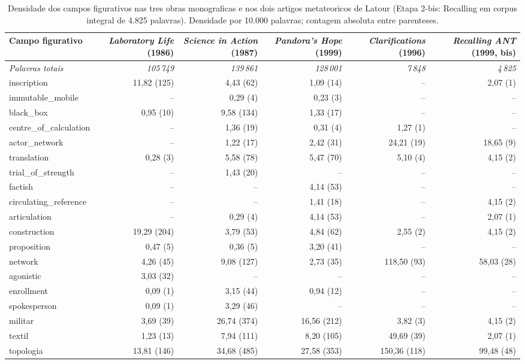 \begin{table}[htbp]
\centering
\caption{Densidade dos campos figurativos nas tres obras monograficas e nos dois artigos metateoricos de Latour (Etapa 2-bis: Recalling em corpus integral de 4.825 palavras). Densidade por 10.000 palavras; contagem absoluta entre parenteses.}
\label{tab:figuracoes_latour_5_obras_bis}
\small
\begin{tabular}{lrrrrr}
\toprule
Campo figurativo & \emph{Laboratory Life} (1986) & \emph{Science in Action} (1987) & \emph{Pandora's Hope} (1999) & \emph{Clarifications} (1996) & \emph{Recalling ANT} (1999, bis) \\
\midrule
\textit{Palavras totais} & \textit{105\,749} & \textit{139\,861} & \textit{128\,001} & \textit{7\,848} & \textit{4\,825} \\
\midrule
inscription & 11{,}82 (125) & 4{,}43 (62) & 1{,}09 (14) & -- & 2{,}07 (1) \\
immutable\_mobile & -- & 0{,}29 (4) & 0{,}23 (3) & -- & -- \\
black\_box & 0{,}95 (10) & 9{,}58 (134) & 1{,}33 (17) & -- & -- \\
centre\_of\_calculation & -- & 1{,}36 (19) & 0{,}31 (4) & 1{,}27 (1) & -- \\
actor\_network & -- & 1{,}22 (17) & 2{,}42 (31) & 24{,}21 (19) & 18{,}65 (9) \\
translation & 0{,}28 (3) & 5{,}58 (78) & 5{,}47 (70) & 5{,}10 (4) & 4{,}15 (2) \\
trial\_of\_strength & -- & 1{,}43 (20) & -- & -- & -- \\
factish & -- & -- & 4{,}14 (53) & -- & -- \\
circulating\_reference & -- & -- & 1{,}41 (18) & -- & 4{,}15 (2) \\
articulation & -- & 0{,}29 (4) & 4{,}14 (53) & -- & 2{,}07 (1) \\
construction & 19{,}29 (204) & 3{,}79 (53) & 4{,}84 (62) & 2{,}55 (2) & 4{,}15 (2) \\
proposition & 0{,}47 (5) & 0{,}36 (5) & 3{,}20 (41) & -- & -- \\
network & 4{,}26 (45) & 9{,}08 (127) & 2{,}73 (35) & 118{,}50 (93) & 58{,}03 (28) \\
agonistic & 3{,}03 (32) & -- & -- & -- & -- \\
enrollment & 0{,}09 (1) & 3{,}15 (44) & 0{,}94 (12) & -- & -- \\
spokesperson & 0{,}09 (1) & 3{,}29 (46) & -- & -- & -- \\
militar & 3{,}69 (39) & 26{,}74 (374) & 16{,}56 (212) & 3{,}82 (3) & 4{,}15 (2) \\
textil & 1{,}23 (13) & 7{,}94 (111) & 8{,}20 (105) & 49{,}69 (39) & 2{,}07 (1) \\
topologia & 13{,}81 (146) & 34{,}68 (485) & 27{,}58 (353) & 150{,}36 (118) & 99{,}48 (48) \\
\bottomrule
\end{tabular}
\end{table}
